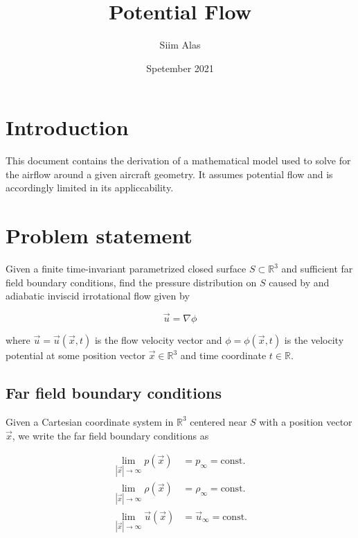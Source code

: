 \documentclass{article}
\title{Potential Flow}
\author{Siim Alas}
\date{Spetember 2021}
\begin{document}
\maketitle

\section*{Introduction}

This document contains the derivation of a mathematical model used to solve for
the airflow around a given aircraft geometry. It assumes potential flow and is
accordingly limited in its appliccability.

\section{Problem statement}

Given a finite time-invariant parametrized closed surface $S \subset
\mathbb{R}^3$ and sufficient far field boundary conditions, find the pressure
distribution on $S$ caused by and adiabatic inviscid irrotational flow given by

\begin{equation}
\label{eq:DefinitionOfPotentialFlow}
	\vec{u} = \nabla \phi
\end{equation}

where $\vec{u} = \vec{u}(\vec{x}, t)$ is the flow velocity vector and $\phi =
\phi(\vec{x}, t)$ is the velocity potential at some position vector $\vec{x} \in
\mathbb{R}^3$ and time coordinate $t \in \mathbb{R}$.

\subsection{Far field boundary conditions}

Given a Cartesian coordinate system in $\mathbb{R}^3$ centered near $S$ with a
position vector $\vec{x}$, we write the far field boundary conditions as

\begin{subequations}
	\begin{align}
		\lim_{|\vec{x}| \rightarrow \infty} p(\vec{x})  & = p_{\infty} =
		\text{const.} \label{eq:FarFieldPressureConstraint} \\
		\lim_{|\vec{x}| \rightarrow \infty} \rho(\vec{x})  & = \rho_{\infty} =
		\text{const.}
		\label{eq:FarFieldDensityConstraint} \\
		\lim_{|\vec{x}| \rightarrow \infty} \vec{u}(\vec{x}) & =
		\vec{u}_{\infty} = \text{const.}
		\label{eq:FarFieldVelocityConstraint}
	\end{align}
\end{subequations}
\end{document}

